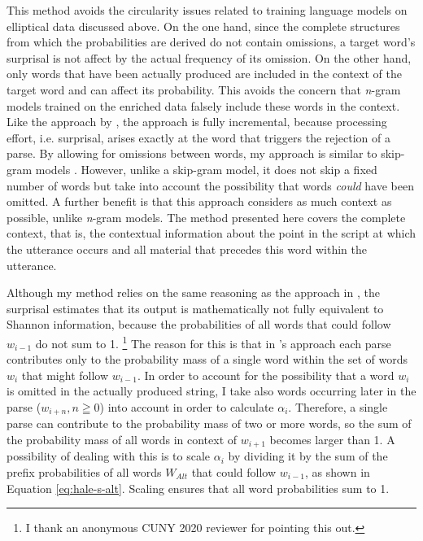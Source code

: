 This method avoids the circularity issues related to training language models on elliptical data discussed above. On the one hand, since the complete structures from which the probabilities are derived do not contain omissions, a target word's surprisal is not affect by the actual frequency of its omission. On the other hand, only words that have been actually produced are included in the context of the target word and can affect its probability. This avoids the concern that \textit{n}-gram models trained on the enriched data falsely include these words in the context. Like the approach by \citet{hale2001}, the approach is fully incremental, because processing effort, i.e. surprisal, arises exactly at the word that triggers the rejection of a parse. By allowing for omissions between words, my approach is similar to skip-gram models \citep{jans.etal2012}. However, unlike a skip-gram model, it does not skip a fixed number of words but take into account the possibility that words \textit{could} have been omitted. A further benefit is that this approach considers as much context as possible, unlike \textit{n}-gram models. The method presented here covers the complete context, that is, the contextual information about the point in the script at which the utterance occurs and all material that precedes this word within the utterance.

Although my method relies on the same reasoning as the approach in \citet{hale2001}, the surprisal estimates that its output is mathematically not fully equivalent to Shannon information, because the probabilities of all words that could follow $w_{i-1}$ do not sum to 1.%
%
\footnote{I thank an anonymous CUNY 2020 reviewer for pointing this out.}\afterfn%
%
The reason for this is that in \citeauthor{hale2001}'s approach each parse contributes only to the probability mass of a single word within the set of words $w_i$ that might follow $w_{i-1}$. In order to account for the possibility that a word $w_{i}$ is omitted in the actually produced string, I take also words occurring later in the parse ($w_{i+n}, n \geqq 0$) into account in order to calculate $\alpha_i$. Therefore, a single parse can contribute to the probability mass of two or more words, so the sum of the probability mass of all words in context of $w_{i+1}$ becomes larger than 1. A possibility of dealing with this is to scale $\alpha_i$ by dividing it by the sum of the prefix probabilities of all words $W_{Alt}$ that could follow $w_{i-1}$, as shown in Equation \ref{eq:hale-s-alt}. Scaling ensures that all word probabilities sum to 1.

